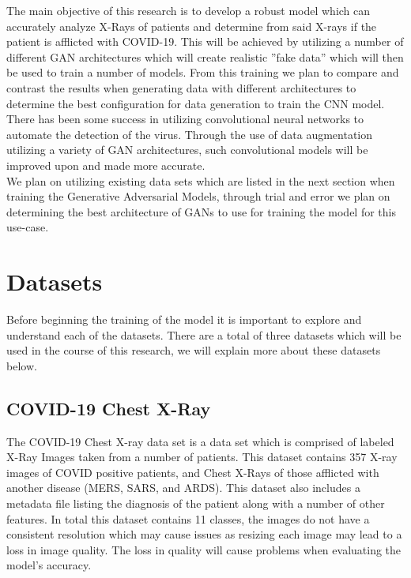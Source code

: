 \vspace{0.5mm}
The main objective of this research is to develop a robust model which can accurately analyze X-Rays of patients and determine from said X-rays if the patient is afflicted with COVID-19.  This will be achieved by utilizing a number of different GAN architectures which will create realistic ''fake data'' which will then be used to train a number of models. From this training we plan to compare and contrast the results when generating data with different architectures to determine the best configuration for data generation to train the CNN model.  There has been some success in utilizing convolutional neural networks to automate the detection of the virus\cite{cnnCOVID19DetectionAhmed}\cite{cnnCOVID19DetectionLopez}.  Through the use of data augmentation utilizing a variety of GAN architectures, such convolutional models will be improved upon and made more accurate.
\\
We plan on utilizing existing data sets which are listed in the next section when training the Generative Adversarial Models, through trial and error we plan on determining the best architecture of GANs to use for training the model for this use-case.
\section{Datasets}
Before beginning the training of the model it is important to explore and understand each of the datasets.  There are a total of three datasets which will be used in the course of this research, we will explain more about these datasets below.
\subsection{COVID-19 Chest X-Ray}
The COVID-19 Chest X-ray data set is a data set which is comprised of labeled X-Ray Images taken from a number of patients. This dataset contains 357 X-ray images of COVID positive patients, and Chest X-Rays of those afflicted with another disease (MERS, SARS, and ARDS).  This dataset also includes a metadata file listing the diagnosis of the patient along with a number of other features.\cite{xrayDataset} In total this dataset contains 11 classes, the images do not have a consistent resolution which may cause issues as resizing each image may lead to a loss in image quality.  The loss in quality will cause problems when evaluating the model's accuracy.
\\
